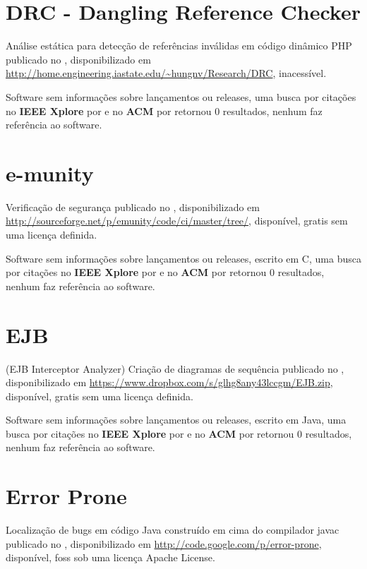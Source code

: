 \section{DRC - Dangling Reference Checker}

Análise estática para detecção de referências inválidas em código dinâmico PHP
publicado no  ,
disponibilizado em \url{http://home.engineering.iastate.edu/~hungnv/Research/DRC},
inacessível.

Software sem informações sobre lançamentos ou releases,
uma busca por citações no {\bf IEEE Xplore} por
\texttt{}
e no {\bf ACM} por
\texttt{}
retornou
0 resultados,
nenhum faz referência ao software.



\section{e-munity}

Verificação de segurança
publicado no  ,
disponibilizado em \url{http://sourceforge.net/p/emunity/code/ci/master/tree/},
disponível,
gratis
sem uma licença definida.

Software sem informações sobre lançamentos ou releases,
escrito em C,
uma busca por citações no {\bf IEEE Xplore} por
\texttt{}
e no {\bf ACM} por
\texttt{}
retornou
0 resultados,
nenhum faz referência ao software.



\section{EJB}

(EJB Interceptor Analyzer) Criação de diagramas de sequência
publicado no  ,
disponibilizado em \url{https://www.dropbox.com/s/glhg8any43lccgm/EJB.zip},
disponível,
gratis
sem uma licença definida.

Software sem informações sobre lançamentos ou releases,
escrito em Java,
uma busca por citações no {\bf IEEE Xplore} por
\texttt{}
e no {\bf ACM} por
\texttt{}
retornou
0 resultados,
nenhum faz referência ao software.



\section{Error Prone}

Localização de bugs em código Java construído em cima do compilador javac
publicado no  ,
disponibilizado em \url{http://code.google.com/p/error-prone},
disponível,
foss
sob uma licença Apache License.

